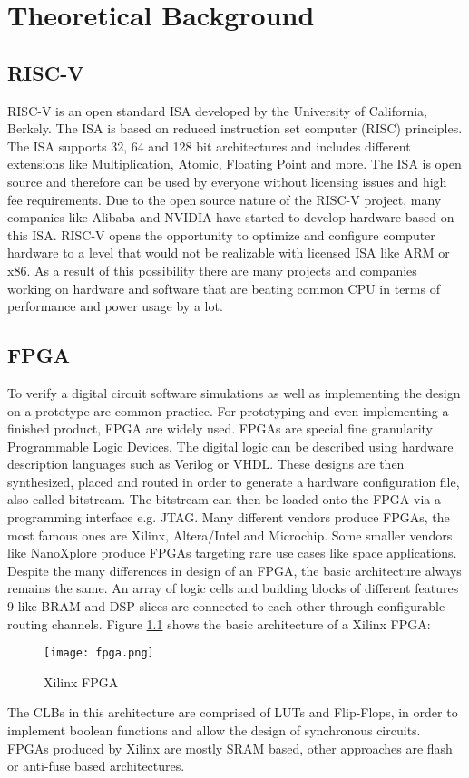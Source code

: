
\chapter{Theoretical Background}
\section{RISC-V}
RISC-V is an open standard \acf{ISA} developed by the
University of California, Berkely. The ISA is based on reduced instruction set
computer (RISC) principles. The ISA supports 32, 64 and 128 bit architectures and
includes different extensions like Multiplication, Atomic, Floating Point and more. The
ISA is open source and therefore can be used by everyone without licensing issues
and high fee requirements. Due to the open source nature of the RISC-V project,
many companies like Alibaba and NVIDIA have started to develop hardware based
on this ISA.
RISC-V opens the opportunity to optimize and configure computer hardware to a
level that would not be realizable with licensed ISA like ARM or x86. As a result of
this possibility there are many projects and companies working on hardware and
software that are beating common CPU in terms of performance and power usage
by a lot.


\section{FPGA}
To verify a digital circuit software simulations as well as implementing the design on
a prototype are common practice. For prototyping and even implementing a finished
product, FPGA are widely used.
FPGAs are special fine granularity Programmable Logic Devices. The digital logic
can be described using hardware description languages such as Verilog or VHDL.
These designs are then synthesized, placed and routed in order to generate a
hardware configuration file, also called bitstream. The bitstream can then be loaded
onto the FPGA via a programming interface e.g. JTAG.
Many different vendors produce FPGAs, the most famous ones are Xilinx,
Altera/Intel and Microchip. Some smaller vendors like NanoXplore produce FPGAs
targeting rare use cases like space applications.
Despite the many differences in design of an FPGA, the basic architecture always
remains the same. An array of logic cells and building blocks of different features
9 like BRAM and DSP slices are connected to each other through configurable routing
channels.
Figure \ref{fig:FPGA} shows the basic architecture of a Xilinx FPGA:\\

\begin{figure}[h]
\centering
\texttt{[image: fpga.png]}
\caption{Xilinx FPGA\footnotemark}
\label{fig:FPGA}
\end{figure}



The CLBs in this architecture are comprised of LUTs and Flip-Flops, in order to implement boolean functions and allow the design of synchronous circuits. FPGAs produced by Xilinx are mostly SRAM based, other approaches are flash or anti-fuse based architectures.
